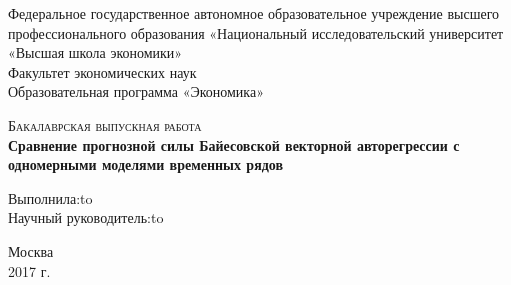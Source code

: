 \begin{titlepage}
  \begin{center}
Федеральное государственное автономное образовательное учреждение высшего профессионального образования «Национальный исследовательский университет «Высшая школа экономики»\\
\large
\vspace{0.5cm}
Факультет экономических наук\\
\vspace{0.25cm}
Образовательная программа «Экономика»
\vfill
    
\textsc{Бакалаврская выпускная работа}\\[5mm]
{\textbf{\large Сравнение прогнозной силы Байесовской векторной авторегрессии с одномерными моделями временных рядов}\\[2mm]}
\bigskip   
\end{center}
\vfill
\vfill

\newbox{\lbox}  \newlength{\maxl} \setlength{\maxl}{\wd\lbox} \hfill\parbox{11.5cm}{ \hspace*{5cm}\hspace*{-5cm}Выполнила:\hfill\hbox to\\ \hspace*{5cm}\hspace*{-5cm}Научный руководитель:\hfill\hbox to\\  } 

\vfill



\begin{center}
  Москва\\ 2017 г.
\end{center}

\end{titlepage}
